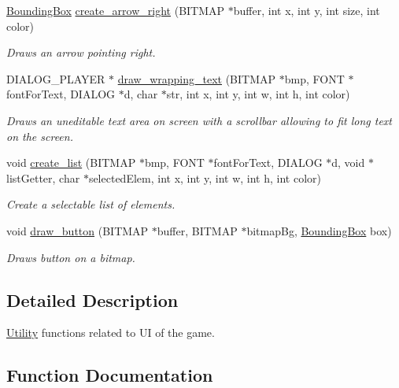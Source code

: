 \begin{DoxyCompactItemize}
\mbox{\hyperlink{struct_bounding_box}{Bounding\+Box}} \mbox{\hyperlink{namespace_utility_a8f88e0af8573389c222b7bbb4873abca}{create\+\_\+arrow\+\_\+right}} (B\+I\+T\+M\+AP $\ast$buffer, int x, int y, int size, int color)
\begin{DoxyCompactList}\small\item\em Draws an arrow pointing right. \end{DoxyCompactList}\item 
D\+I\+A\+L\+O\+G\+\_\+\+P\+L\+A\+Y\+ER $\ast$ \mbox{\hyperlink{namespace_utility_a48d4a30c00ec5a7cfe605b98f3e3fbea}{draw\+\_\+wrapping\+\_\+text}} (B\+I\+T\+M\+AP $\ast$bmp, F\+O\+NT $\ast$font\+For\+Text, D\+I\+A\+L\+OG $\ast$d, char $\ast$str, int x, int y, int w, int h, int color)
\begin{DoxyCompactList}\small\item\em Draws an uneditable text area on screen with a scrollbar allowing to fit long text on the screen. \end{DoxyCompactList}\item 
void \mbox{\hyperlink{namespace_utility_ade99ae97d8a1df577174b699ef95f8d5}{create\+\_\+list}} (B\+I\+T\+M\+AP $\ast$bmp, F\+O\+NT $\ast$font\+For\+Text, D\+I\+A\+L\+OG $\ast$d, void $\ast$list\+Getter, char $\ast$selected\+Elem, int x, int y, int w, int h, int color)
\begin{DoxyCompactList}\small\item\em Create a selectable list of elements. \end{DoxyCompactList}\item 
void \mbox{\hyperlink{namespace_utility_a516b74172dcbf11c77b00b94b5cf130b}{draw\+\_\+button}} (B\+I\+T\+M\+AP $\ast$buffer, B\+I\+T\+M\+AP $\ast$bitmap\+Bg, \mbox{\hyperlink{struct_bounding_box}{Bounding\+Box}} box)
\begin{DoxyCompactList}\small\item\em Draws button on a bitmap. \end{DoxyCompactList}\end{DoxyCompactItemize}


\subsection{Detailed Description}
\mbox{\hyperlink{namespace_utility}{Utility}} functions related to UI of the game. 



\subsection{Function Documentation}
\mbox{\label{namespace_utility_ad1e2e7751248795478a0d207430bbd6c}} 
